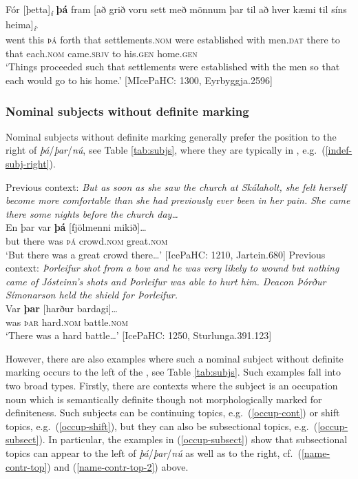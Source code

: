 \documentclass[output=paper,colorlinks,citecolor=brown]{langscibook}
\begin{document}
\ea \label{thetta-da}
\gll Fór [þetta]\textsubscript{\textit{i}} \textbf{þá} fram [að grið voru sett með mönnum þar til að hver kæmi til síns heima]\textsubscript{\textit{i}}.\\
went this \textsc{þá} forth that settlements.\textsc{nom} were established with men.\textsc{dat} there to that each.\textsc{nom} came.\textsc{sbjv} to his.\textsc{gen} home.\textsc{gen}\\
\glt `Things proceeded such that settlements were established with the men so that each would go to his home.' \hfill [MIcePaHC: 1300, Eyrbyggja.2596]
\z 


\subsubsection{Nominal subjects without definite marking}

Nominal subjects without definite marking generally prefer the position to the right of \textit{þá}/\textit{þar}/\textit{nú}, see Table \ref{tab:subjs}, where they are typically in , e.g.~(\ref{indef-subj-right}).

\ea \label{indef-subj-right}
\ea 
    Previous context: \textit{But as soon as she saw the church at Skálaholt, she felt herself become more comfortable than she had previously ever been in her pain. She came there some nights before the church day\dots}\\
    \gll En þar var \textbf{þá} [fjölmenni mikið]\dots\\
    but there was \textsc{þá} crowd.\textsc{nom} great.\textsc{nom}\\
    \glt `But there was a great crowd there\dots' \hfill [IcePaHC: 1210, Jartein.680]
\ex
    Previous context: \textit{Þorleifur shot from a bow and he was very likely to wound but nothing came of Jósteinn's shots and Þorleifur was able to hurt him. Deacon Þórður Símonarson held the shield for Þorleifur.}\\
    \gll Var \textbf{þar} [harður bardagi]\dots\\
    was \textsc{þar} hard.\textsc{nom} battle.\textsc{nom}\\
    \glt `There was a hard battle\dots' \hfill [IcePaHC: 1250, Sturlunga.391.123]
\z 
\z

\largerpage[2]
However, there are also examples where such a nominal subject without definite marking occurs to the left of the , see Table \ref{tab:subjs}. Such examples fall into two broad types. Firstly, there are contexts where the subject is an occupation noun which is semantically definite though not morphologically marked for definiteness. Such subjects can be continuing topics, e.g.~(\ref{occup-cont}) or shift topics, e.g.~(\ref{occup-shift}), but they can also be subsectional topics, e.g.~(\ref{occup-subsect}). In particular, the examples in  (\ref{occup-subsect}) show that subsectional topics can appear to the left of  \textit{þá}/\textit{þar}/\textit{nú} as well as to the right, cf.~(\ref{name-contr-top}) and (\ref{name-contr-top-2}) above.
\end{document}
